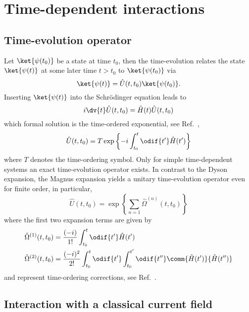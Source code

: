 \section{Time-dependent interactions}

\subsection{Time-evolution operator}

Let $\ket{\psi(t_0)}$ be a state at time $t_0$, then the time-evolution relates the state $\ket{\psi(t)}$ at some later time $t>t_0$ to $\ket{\psi(t_0)}$ via
\begin{equation}
	\ket{\psi(t)}
	=
	\hat{U}(t,t_0)
	\ket{\psi(t_0)}
	.
\end{equation}
Inserting $\ket{\psi(t)}$ into the Schrödinger equation leads to
\begin{equation}
	i\dv{t}
	\hat{U}(t,t_0)
	=
	\hat{H}(t)
	\hat{U}(t,t_0)
\end{equation}
which formal solution is the time-ordered exponential, see Ref.~\cite[p.~380]{Bartelmann2018},
\begin{equation}
	\hat{U}(t,t_0)
	=
	T\exp\left\{
		-i
		\int_{t_0}^t\odif{t^\prime}
		\hat{H}(t^\prime)
	\right\}
\end{equation}
where $T$ denotes the time-ordering symbol.
Only for simple time-dependent systems an exact time-evolution operator exists.
In contrast to the Dyson expansion, the Magnus expansion yields a unitary time-evolution operator even for finite order, in particular,
\begin{equation}
	\hat{U}(t,t_0)
	=
	\exp\left\{
		\sum_{n=1}
		\hat{\Omega}^{(n)}(t,t_0)
	\right\}
\end{equation}
where the first two expansion terms are given by
\begin{align}
	\hat{\Omega}^{(1)}(t,t_0)
	&=
	\frac{(-i)}{1!}
	\int_{t_0}^t\odif{t^\prime}
	\hat{H}(t^\prime)
	\\
	\hat{\Omega}^{(2)}(t,t_0)
	&=
	\frac{(-i)^2}{2!}
	\int_{t_0}^t\odif{t^\prime}
	\int_{t_0}^{t^\prime}\odif{t^{\prime\prime}}
	\comm{\hat{H}(t^\prime)}{\hat{H}(t^{\prime\prime})}
\end{align}
and represent time-ordering corrections, see Ref.~\cite{QuesadaMejia2015}.

\subsection{Interaction with a classical current field}

